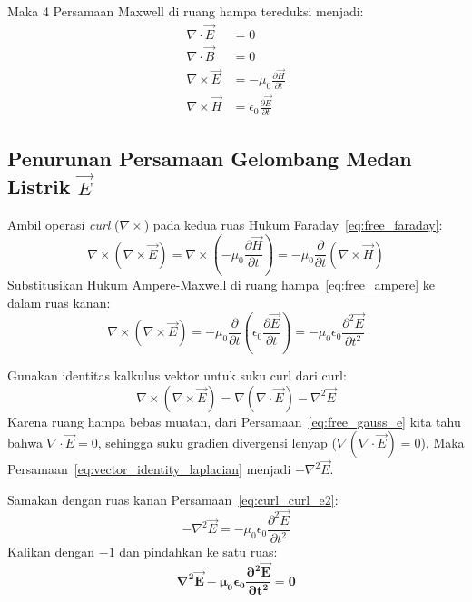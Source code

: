 \documentclass[11pt,a4paper]{article}
\theoremstyle{definition}
\begin{document}
Maka 4 Persamaan Maxwell di ruang hampa tereduksi menjadi:
\begin{align}
    \nabla \cdot \vec{E} &= 0 \label{eq:free_gauss_e} \\
    \nabla \cdot \vec{B} &= 0 \label{eq:free_gauss_b} \\
    \nabla \times \vec{E} &= -\mu_0 \frac{\partial \vec{H}}{\partial t} \label{eq:free_faraday} \\
    \nabla \times \vec{H} &= \epsilon_0 \frac{\partial \vec{E}}{\partial t} \label{eq:free_ampere}
\end{align}

\subsection{Penurunan Persamaan Gelombang Medan Listrik \texorpdfstring{$\vec{E}$}{E}}
Ambil operasi \textit{curl} ($\nabla \times$) pada kedua ruas Hukum Faraday~\eqref{eq:free_faraday}:
\begin{equation}
    \nabla \times (\nabla \times \vec{E}) = \nabla \times \left( -\mu_0 \frac{\partial \vec{H}}{\partial t} \right) = -\mu_0 \frac{\partial}{\partial t} (\nabla \times \vec{H})
    \label{eq:curl_curl_e}
\end{equation}
Substitusikan Hukum Ampere-Maxwell di ruang hampa~\eqref{eq:free_ampere} ke dalam ruas kanan:
\begin{equation}
    \nabla \times (\nabla \times \vec{E}) = -\mu_0 \frac{\partial}{\partial t} \left( \epsilon_0 \frac{\partial \vec{E}}{\partial t} \right) = -\mu_0 \epsilon_0 \frac{\partial^2 \vec{E}}{\partial t^2}
    \label{eq:curl_curl_e2}
\end{equation}

Gunakan identitas kalkulus vektor untuk suku curl dari curl:
\begin{equation}
    \nabla \times (\nabla \times \vec{E}) = \nabla(\nabla \cdot \vec{E}) - \nabla^2 \vec{E}
    \label{eq:vector_identity_laplacian}
\end{equation}
Karena ruang hampa bebas muatan, dari Persamaan~\eqref{eq:free_gauss_e} kita tahu bahwa $\nabla \cdot \vec{E} = 0$, sehingga suku gradien divergensi lenyap ($\nabla(\nabla \cdot \vec{E}) = 0$). Maka Persamaan~\eqref{eq:vector_identity_laplacian} menjadi $-\nabla^2 \vec{E}$.

Samakan dengan ruas kanan Persamaan~\eqref{eq:curl_curl_e2}:
\begin{equation}
    -\nabla^2 \vec{E} = -\mu_0 \epsilon_0 \frac{\partial^2 \vec{E}}{\partial t^2}
\end{equation}
Kalikan dengan $-1$ dan pindahkan ke satu ruas:
\begin{equation}
    \mathbf{\nabla^2 \vec{E} - \mu_0 \epsilon_0 \frac{\partial^2 \vec{E}}{\partial t^2} = 0}
    \label{eq:wave_equation_e}
\end{equation}
\end{document}
